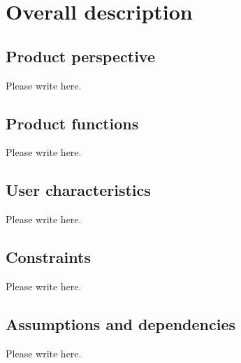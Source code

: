 \section{Overall description}
\dd


\subsection{Product perspective}

Please write here.


\subsection{Product functions}

Please write here.


\subsection{User characteristics}

Please write here.


\subsection{Constraints}

Please write here.


\subsection{Assumptions and dependencies}

Please write here.

